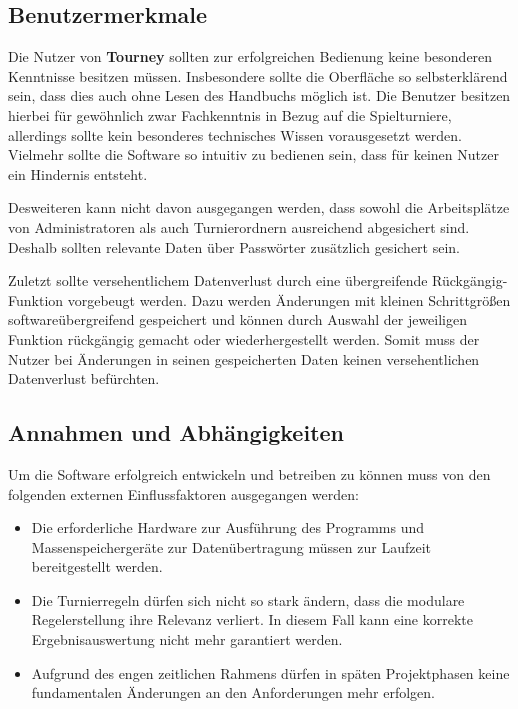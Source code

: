 \documentclass[11pt]{article}
\begin{document}
\subsection{Benutzermerkmale}

Die Nutzer von \textbf{Tourney} sollten zur erfolgreichen Bedienung keine besonderen Kenntnisse besitzen müssen. Insbesondere sollte die Oberfläche so selbsterklärend sein, dass dies auch ohne Lesen des Handbuchs möglich ist. Die Benutzer besitzen hierbei für gewöhnlich zwar Fachkenntnis in Bezug auf die Spielturniere, allerdings sollte kein besonderes technisches Wissen vorausgesetzt werden. Vielmehr sollte die Software so intuitiv zu bedienen sein, dass für keinen Nutzer ein Hindernis entsteht.

Desweiteren kann nicht davon ausgegangen werden, dass sowohl die Arbeitsplätze von Administratoren als auch Turnierordnern ausreichend abgesichert sind. Deshalb sollten relevante Daten über Passwörter zusätzlich gesichert sein.

Zuletzt sollte versehentlichem Datenverlust durch eine übergreifende Rückgängig-Funktion vorgebeugt werden. Dazu werden Änderungen mit kleinen Schrittgrößen softwareübergreifend gespeichert und können durch Auswahl der jeweiligen Funktion rückgängig gemacht oder wiederhergestellt werden. Somit muss der Nutzer bei Änderungen in seinen gespeicherten Daten keinen versehentlichen Datenverlust befürchten.

\subsection{Annahmen und Abhängigkeiten}

Um die Software erfolgreich entwickeln und betreiben zu können muss von den folgenden externen Einflussfaktoren ausgegangen werden:
\begin{itemize}
	\item Die erforderliche Hardware zur Ausführung des Programms und Massenspeichergeräte zur Datenübertragung müssen zur Laufzeit bereitgestellt werden.
	\item Die Turnierregeln dürfen sich nicht so stark ändern, dass die modulare Regelerstellung ihre Relevanz verliert. In diesem Fall kann eine korrekte Ergebnisauswertung nicht mehr garantiert werden.
	\item Aufgrund des engen zeitlichen Rahmens dürfen in späten Projektphasen keine fundamentalen Änderungen an den Anforderungen mehr erfolgen.
\end{itemize}
\end{document}
